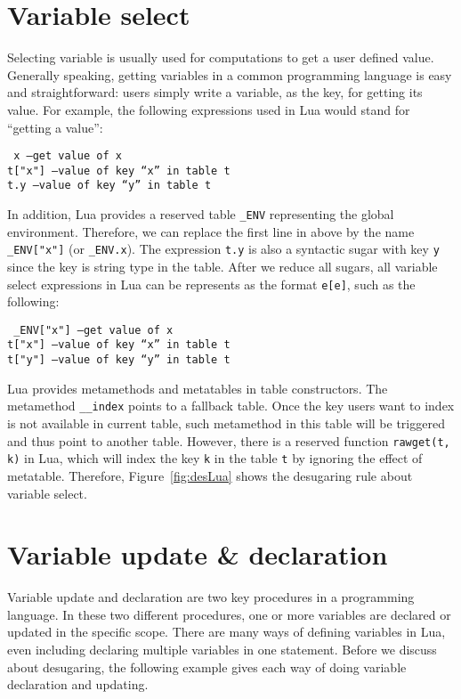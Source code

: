 \section{Variable select}
Selecting variable is usually used for computations to get a user defined value. Generally speaking, getting variables in a common programming language is easy and straightforward: users simply write a variable, as the key, for getting its value. For example, the following expressions used in Lua would stand for ``getting a value'':
\begin{flushleft}
{\tt
x ---get value of x\\
t["x"] ---value of key ``x'' in table t\\
t.y ---value of key ``y'' in table t\\
}
\end{flushleft}
In addition, Lua provides a reserved table {\tt \_ENV} representing the global environment. Therefore, we can replace the first line in above by the name {\tt \_ENV["x"]} (or {\tt \_ENV.x}). The expression {\tt t.y} is also a syntactic sugar with key {\tt y} since the key is string type in the table. After we reduce all sugars, all variable select expressions in Lua can be represents as the format {\tt e[e]}, such as the following:
\begin{flushleft}
{\tt
\_ENV["x"] ---get value of x\\
t["x"] ---value of key ``x'' in table t\\
t["y"] ---value of key ``y'' in table t\\
}
\end{flushleft}

Lua provides metamethods and metatables in table constructors. The metamethod {\tt \_\_index} points to a fallback table. Once the key users want to index is not available in current table, such metamethod in this table will be triggered and thus point to another table. However, there is a reserved function {\tt rawget(t, k)} in Lua, which will index the key {\tt k} in the table {\tt t} by ignoring the effect of metatable. Therefore, Figure~\ref{fig:desLua} shows the desugaring rule about variable select.

\section{Variable update \& declaration}
Variable update and declaration are two key procedures in a programming language. In these two different procedures, one or more variables are declared or updated in the specific scope. There are many ways of defining variables in Lua, even including declaring multiple variables in one statement. Before we discuss about desugaring,  the following example gives each way of doing variable declaration and updating.


